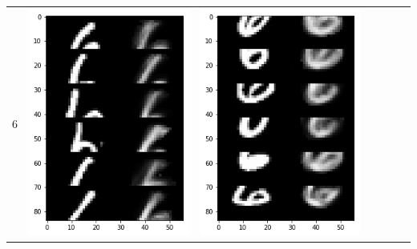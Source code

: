 \documentclass[12pt]{report} %
\begin{document}
\begin{tabular}{m{0.7cm}m{2.4cm}m{2.4cm}m{2.4cm}m{2.4cm}m{2.4cm}m{2.4cm}}
	6 & \includegraphics[scale=0.3]{pictures/KE_6_up.png} & \includegraphics[scale=0.3]{pictures/KE_6_down.png} &

\end{tabular}
\end{document}
